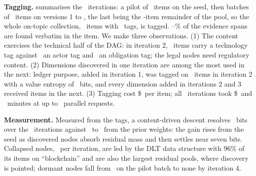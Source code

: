 \begin{table}[t]
  \centering
  \caption{\NIterCap\ maintenance iterations. Each tags a disjoint batch with the
  catalogue version in force, measures the DAG on it, discovers candidates at
  the target nodes and consolidates the accepted ones into the next version.
  Evid.\ is the share of evidence spans found verbatim in the item; Nodes used
  counts nodes that received at least one item; USD and minutes cover tagging,
  discovery and consolidation at list price, with \WorkersMin\ to \WorkersMax\
  parallel requests.}
  \label{tab:evolution}
  \scriptsize
  
\end{table}

\textbf{Tagging.}  summarises the \NIterWord\ iterations:
a pilot of \CItems\ items on the seed, then batches of \TItems\ items on
versions 1 to \LCat, the last being the \LItems-item remainder of the pool,
so the whole on-topic collection, \AllItems\ items with \AllTags\ tags, is
tagged. \EvidMin--\EvidMax\% of the evidence spans are found verbatim in the
item. We make three observations. (1) The content exercises the technical
half of the DAG: in iteration 2, \TCovTech\ items carry a technology tag
against \TCovActor\ an actor tag and \TCovOblig\ an obligation tag; the legal
nodes need regulatory content. (2) Dimensions discovered in one iteration are among the
most used in the next: ledger purpose, added in iteration 1, was tagged on
\TLedgerPurpose\ items in iteration 2 with a value entropy of
\TEntLedgerPurpose\ bits, and every dimension added in iterations 2 and 3
received items in the next. (3) Tagging cost \$\LCostPerItem\ per item; all \NIterWord\ iterations took
\$\AllCost\ and \AllWallMin\ minutes at up to \WorkersMax\ parallel requests.

\textbf{Measurement.} Measured from the tags, a content-driven descent
resolves \BitsSeq\ bits over the \NIterWord\ iterations against \EBitsPrior\
to \LPriorBits\ from the prior weights: the gain rises from the
seed as discovered nodes absorb residual mass and then settles near seven
bits. Collapsed nodes, \CollapsedSeq\ per iteration, are led by the DLT data
structure with 96\% of its items on ``blockchain'' and are also the largest
residual pools, where discovery is pointed; dormant nodes fall from
\MDormantFirst\ on the pilot batch to none by iteration 4.

